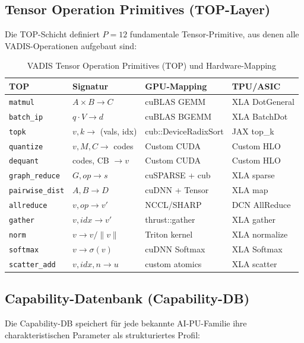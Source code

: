 ﻿\documentclass[12pt,a4paper]{article}
\begin{document}
\subsection{Tensor Operation Primitives (TOP-Layer)}
\label{sub:top_layer}

Die TOP-Schicht definiert $P = 12$ fundamentale Tensor-Primitive,
aus denen alle VADIS-Operationen aufgebaut sind:

\begin{table}[ht]
\centering
\small
\caption{VADIS Tensor Operation Primitives (TOP) und Hardware-Mapping}
\label{tab:top}
\begin{tabular}{@{}p{1.6cm}p{2.4cm}p{2.2cm}p{2.0cm}@{}}
\toprule
\textbf{TOP} & \textbf{Signatur} & \textbf{GPU-Mapping} & \textbf{TPU/ASIC} \\
\midrule
\texttt{matmul} & $A \times B \to C$ & cuBLAS GEMM & XLA DotGeneral \\
\texttt{batch\_ip} & $q \cdot V \to d$ & cuBLAS BGEMM & XLA BatchDot \\
\texttt{topk} & $v, k \to$ (vals, idx) & cub::DeviceRadixSort & JAX top\_k \\
\texttt{quantize} & $v, M, C \to$ codes & Custom CUDA & Custom HLO \\
\texttt{dequant} & codes, CB $\to v$ & Custom CUDA & Custom HLO \\
\texttt{graph\_reduce} & $G, op \to s$ & cuSPARSE + cub & XLA sparse \\
\texttt{pairwise\_dist} & $A, B \to D$ & cuDNN + Tensor & XLA map \\
\texttt{allreduce} & $v, op \to v'$ & NCCL/SHARP & DCN AllReduce \\
\texttt{gather} & $v, idx \to v'$ & thrust::gather & XLA gather \\
\texttt{norm} & $v \to v/\|v\|$ & Triton kernel & XLA normalize \\
\texttt{softmax} & $v \to \sigma(v)$ & cuDNN Softmax & XLA Softmax \\
\texttt{scatter\_add} & $v, idx, n \to u$ & custom atomics & XLA scatter \\
\bottomrule
\end{tabular}
\end{table}

\subsection{Capability-Datenbank (Capability-DB)}
\label{sub:cap_db}

Die Capability-DB speichert für jede bekannte AI-PU-Familie
ihre charakteristischen Parameter als strukturiertes
Profil:
\end{document}

